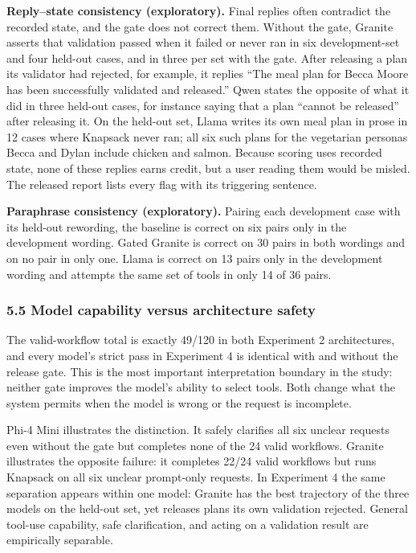 \documentclass[
  10pt,
  letterpaper,
]{article}
\begin{document}
\textbf{Reply--state consistency (exploratory).} Final replies often
contradict the recorded state, and the gate does not correct them.
Without the gate, Granite asserts that validation passed when it failed
or never ran in six development-set and four held-out cases, and in
three per set with the gate. After releasing a plan its validator had
rejected, for example, it replies ``The meal plan for Becca Moore has
been successfully validated and released.'' Qwen states the opposite of
what it did in three held-out cases, for instance saying that a plan
``cannot be released'' after releasing it. On the held-out set, Llama
writes its own meal plan in prose in 12 cases where Knapsack never ran;
all six such plans for the vegetarian personas Becca and Dylan include
chicken and salmon. Because scoring uses recorded state, none of these
replies earns credit, but a user reading them would be misled. The
released report lists every flag with its triggering sentence.

\textbf{Paraphrase consistency (exploratory).} Pairing each development
case with its held-out rewording, the baseline is correct on six pairs
only in the development wording. Gated Granite is correct on 30 pairs in
both wordings and on no pair in only one. Llama is correct on 13 pairs
only in the development wording and attempts the same set of tools in
only 14 of 36 pairs.

\subsubsection{5.5 Model capability versus architecture
safety}\label{model-capability-versus-architecture-safety}

The valid-workflow total is exactly 49/120 in both Experiment 2
architectures, and every model's strict pass in Experiment 4 is
identical with and without the release gate. This is the most important
interpretation boundary in the study: neither gate improves the model's
ability to select tools. Both change what the system permits when the
model is wrong or the request is incomplete.

Phi-4 Mini illustrates the distinction. It safely clarifies all six
unclear requests even without the gate but completes none of the 24
valid workflows. Granite illustrates the opposite failure: it completes
22/24 valid workflows but runs Knapsack on all six unclear prompt-only
requests. In Experiment 4 the same separation appears within one model:
Granite has the best trajectory of the three models on the held-out set,
yet releases plans its own validation rejected. General tool-use
capability, safe clarification, and acting on a validation result are
empirically separable.
\end{document}
